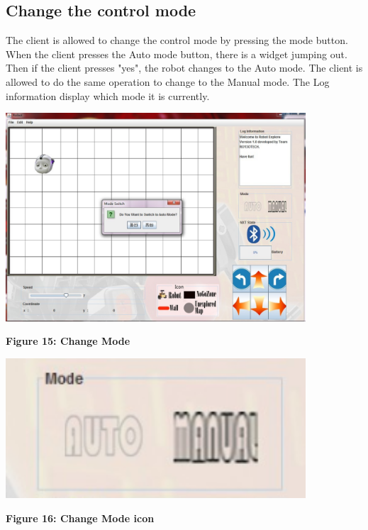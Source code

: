 \documentclass[11pt, a4paper]{report}
\begin{document}
\subsection{Change the control mode}
The client is allowed to change the control mode by pressing the mode button. When the client presses the Auto mode button, there is a widget jumping out. Then if the client presses "yes", the robot changes to the Auto mode. The client is allowed to do the same operation to change to the Manual mode.  The Log information display which mode it is currently.  
\begin{center}
 \includegraphics[width=11.20cm]{changemode.jpg}
\end{center}
\begin{center}
\textbf {Figure 15: Change Mode} \\[0.3cm]
\end{center}
\begin{center}
 \includegraphics[width=11.20cm]{changemode2}
\end{center}
\begin{center}
\textbf {Figure 16: Change Mode icon} \\[0.3cm]
\end{center}
\end{document}
